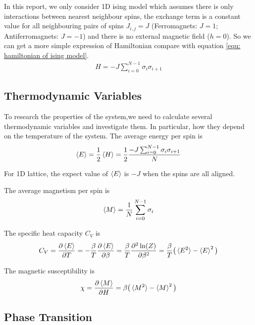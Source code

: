 \documentclass[12pt]{article}
\begin{document}
	In this report, we only consider 1D ising model which assumes there is only interactions between nearest neighbour spins, the exchange term is a constant value for all neighbouring pairs of spins $J_{i,j}=J$ (Ferromagnets: $J=1$; Antiferromagnets: $J=-1$) and there is no external magnetic field ($h=0$). So we can get a more simple expression of Hamiltonian compare with equation \ref{equ: hamiltonian of ising model}.
	\begin{align}
		H=-J\sum_{i=0}^{N-1} \sigma_i \sigma_{i+1}
	\end{align}
	
	\subsection{Thermodynamic Variables}
	\label{sec； thermodynamic variables}
	To research the properties of the system,we need to calculate several thermodynamic variables and investigate them. In particular, how they depend on the temperature of the system. The average energy per spin is
	\begin{align}\label{equ: average energy per spin}
		\braket{E}=\frac{1}{2}\braket{H}=\frac{1}{2}\frac{-J \sum_{i=0}^{N-1} \sigma_i \sigma_{i+1}}{N}
	\end{align}
	
	For 1D lattice, the expect value of $\braket{E}$ is $-J$ when the spins are all aligned.
	
	The average magnetism per spin is 
	\begin{align}\label{equ: average magnetization per spin}
		\braket{M}=\frac{1}{N}\sum_{i=0}^{N-1} \sigma_i
	\end{align}
	
	The specific heat capacity $C_V$ is 
	\begin{align}\label{equ: spefic heat capacity}
		C_V=\frac{\partial \braket{E}}{\partial T}=-\frac{\beta}{T} \frac{\partial \braket{E}}{\partial \beta}=\frac{\beta}{T}\frac{\partial ^2 \ln(Z)}{\partial \beta ^2}=\frac{\beta}{T}\big(\braket{E^2}-\braket{E}^2\big)
	\end{align}
	
	The magnetic susceptibility is 
	\begin{align}
		\chi=\frac{\partial \braket{M}}{\partial H}=\beta \big(\braket{M^2}-\braket{M}^2 \big)
	\end{align}
	
	\subsection{Phase Transition}
	\label{sec: phase transition}
	
\end{document}
